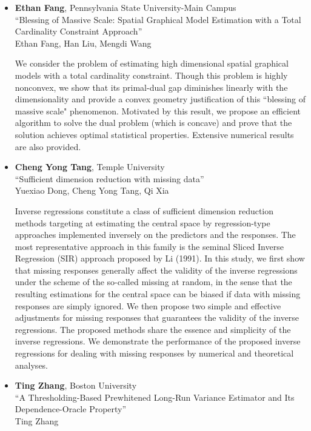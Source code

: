 \begin{itemize}
\item \textbf{Ethan Fang}, Pennsylvania State University-Main Campus \\
``Blessing of Massive Scale: Spatial Graphical Model  Estimation with a Total Cardinality Constraint Approach'' \\
Ethan Fang, Han Liu, Mengdi Wang


We consider the problem of estimating high dimensional spatial graphical models with a total cardinality constraint. Though this problem is highly nonconvex, we show that its primal-dual gap diminishes linearly with the dimensionality and provide a convex geometry justification of this ``blessing of massive scale" phenomenon. Motivated by this result, we propose an efficient algorithm to solve the dual problem (which is concave) and prove that the solution achieves optimal statistical properties. Extensive numerical results are also provided.

\item \textbf{Cheng Yong Tang}, Temple University \\
``Sufficient dimension reduction with missing data'' \\
Yuexiao Dong, Cheng Yong Tang, Qi Xia


Inverse regressions constitute a class of sufficient dimension reduction methods targeting at estimating the central space by regression-type approaches implemented inversely on the predictors and the responses. The most representative approach in this family is the seminal Sliced Inverse Regression (SIR) approach proposed by Li (1991). In this study, we first show that missing responses generally affect the validity of the inverse regressions under the scheme of the so-called missing at random, in the sense that the resulting estimations for the central space can be biased if data with missing responses are simply ignored.  We then propose two simple and effective adjustments for missing responses that guarantees the validity of the inverse regressions. The proposed methods share the essence and simplicity of the inverse regressions. We demonstrate the performance of the proposed inverse regressions for dealing with missing responses by numerical and theoretical analyses. 

\item \textbf{Ting Zhang}, Boston University \\
``A Thresholding-Based Prewhitened Long-Run Variance Estimator and Its Dependence-Oracle Property'' \\
Ting Zhang



\end{itemize}
